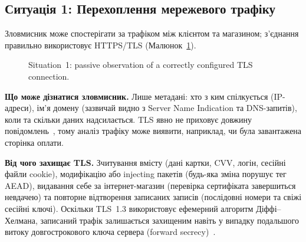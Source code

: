 \subsection{Ситуація 1: Перехоплення мережевого трафіку}
\label{sec:s1}

Зловмисник може спостерігати за трафіком між клієнтом та магазином; з'єднання правильно використовує
HTTPS/TLS (Малюнок~\ref{fig:s1}).

\begin{figure}[H]
    \centering
    \caption{Situation~1: passive observation of a correctly configured TLS connection.}
    \label{fig:s1}
\end{figure}

\textbf{Що може дізнатися зловмисник.} Лише метадані: хто з ким спілкується (IP-адреси), ім'я домену (зазвичай 
видно з Server Name Indication та DNS-запитів), коли та скільки даних надсилається. TLS явно не приховує довжину 
повідомлень~\cite{rfc9846}, тому аналіз трафіку може виявити, наприклад, чи була завантажена сторінка оплати.

\textbf{Від чого захищає TLS.} Зчитування вмісту (дані картки, CVV, логін, сесійні файли cookie), модифікацію 
або injecting пакетів (будь-яка зміна порушує тег AEAD), видавання себе за інтернет-магазин (перевірка сертифіката 
завершиться невдачею) та повторне відтворення записаних записів (послідовні номери та свіжі сесійні ключі). 
Оскільки TLS~1.3 використовує ефемерний алгоритм Діффі–Хелмана, записаний трафік залишається захищеним навіть у 
випадку подальшого витоку довгострокового ключа сервера (forward secrecy)~\cite{rfc9846}.

